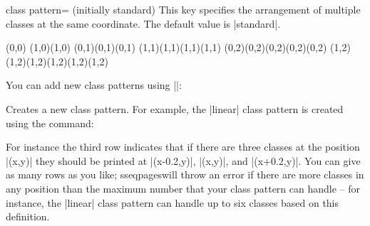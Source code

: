 \documentclass{ltxdoc}
\def\sseqpages{sseqpages}
\begin{document}
\begin{sseqdata}[name=ex1,degree={#1}{1-#1}]
\begin{key}{class pattern= (initially standard)}
This key specifies the arrangement of multiple classes at the same coordinate. The default value is |standard|.
\begin{codeexample}[]
\begin{sseqdata}[name=class pattern example,no axes,ymirror]
\class(0,0)
\class(1,0)\class(1,0)
\class(0,1)\class(0,1)\class(0,1)
\class(1,1)\class(1,1)\class(1,1)\class(1,1)
\class(0,2)\class(0,2)\class(0,2)\class(0,2)\class(0,2)
\class(1,2)\class(1,2)\class(1,2)\class(1,2)\class(1,2)\class(1,2)
\end{sseqdata}

\printpage[name=class pattern example, class pattern=standard]
\printpage[name=class pattern example, change classes=blue,
           class pattern=linear, class placement transform={rotate=45}]
\end{codeexample}

You can add new class patterns using |\sseqnewclasspattern|:
\begin{command}{\sseqnewclasspattern{}}
Creates a new class pattern. For example, the |linear| class pattern is created using the command:
\begin{codeexample}
\end{codeexample}
For instance the third row indicates that if there are three classes at the position |(x,y)| they should be printed at |(x-0.2,y)|, |(x,y)|, and |(x+0.2,y)|. You can give as many rows as you like; \sseqpages\space will throw an error if there are more classes in any position than the maximum number that your class pattern can handle -- for instance, the |linear| class pattern can handle up to six classes based on this definition.
\end{command}
\end{key}



\end{sseqdata}
\end{document}

